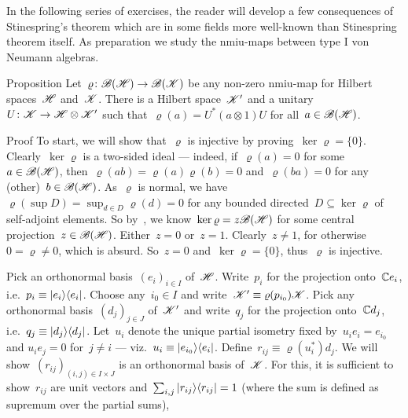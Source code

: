 \begin{parsec}%
\begin{point}%
In the following series of exercises, the reader will develop
    a few consequences of Stinespring's theorem
    which are in some fields more well-known than
    Stinespring theorem itself.
As preparation we study the nmiu-maps between type I von Neumann algebras.
\end{point}
\begin{point}{Proposition}%
Let~$\varrho\colon \mathscr{B}(\mathscr{H}) \to \mathscr{B}(\mathscr{K})$    
be any non-zero nmiu-map for Hilbert spaces~$\mathscr{H}$ and~$\mathscr{K}$.
There is a Hilbert space~$\mathscr{K}'$
    and a unitary~$U\colon \mathscr{K} \to \mathscr{H} \otimes \mathscr{K}'$
    such that~$\varrho(a) = U^* (a\otimes 1) U $
    for all~$a \in \mathscr{B}(\mathscr{H})$.
\begin{point}{Proof}%
To start, we will show that~$\varrho$ is injective
    by proving~$\ker\varrho = \{0\}$.
Clearly~$\ker \varrho$ is a two-sided ideal
    --- indeed, if~$\varrho(a) = 0$ for some~$a\in \mathscr{B}(\mathscr{H})$,
    then~$\varrho(ab) = \varrho(a)\varrho(b) = 0$
        and~$\varrho(ba) = 0$
        for any (other)~$b \in \mathscr{B}(\mathscr{H})$.
As~$\varrho$ is normal,
    we have~$\varrho(\sup D) = \sup_{d \in D} \varrho(d) = 0$
    for any bounded directed~$D\subseteq \ker \varrho$
    of self-adjoint elements.
So by~,
    we know~$\ker \varrho = z \mathscr{B}(\mathscr{H})$
    for some central projection~$z \in \mathscr{B}(\mathscr{H})$.
Either~$z=0$ or~$z=1$.
Clearly~$z\neq 1$, for otherwise~$0=\varrho\neq 0$, which is absurd.
    So~$z=0$ and~$\ker \varrho = \{0\}$, thus~$\varrho $ is injective.
\begin{point}%
Pick an orthonormal basis~$(e_i)_{i \in I}$ of~$\mathscr{H}$.
Write~$p_i$ for the projection onto~$\mathbb{C} e_i$,
    i.e.~$p_i \equiv \left|e_i\right>\!\left<e_i\right|$.
Choose any~$i_0 \in I$
    and write~$\mathscr{K}' \equiv \varrho(p_{i_0}) \mathscr{K}$.
Pick any orthonormal basis~$(d_j)_{j \in J}$ of~$\mathscr{K}'$
    and write~$q_j$ for the projection onto~$\mathbb{C} d_j$,
    i.e.~$q_j \equiv \left|d_j\right>\!\left<d_j\right|$.
Let~$u_i$ denote the unique partial
        isometry fixed by~$u_i e_i = e_{i_0}$ and
                $u_i e_j = 0$ for~$j\neq i$ ---
                viz.~$u_i \equiv \left|e_{i_0}\right>\!\left<e_i\right|$.
    Define~$r_{ij} \equiv \varrho(u_i^*) d_j$.
We will show~$(r_{ij})_{(i,j) \in I\times J}$ is an orthonormal
    basis of~$\mathscr{K}$.
For this, it is sufficient to
    show~$r_{ij}$ are unit vectors
    and~$\sum_{i,j} \left|r_{ij}\right>\!\left<r_{ij}\right| = 1$
    (where the sum is defined as supremum over the partial sums),

\end{point}
\end{point}
\end{point}
\end{parsec}
